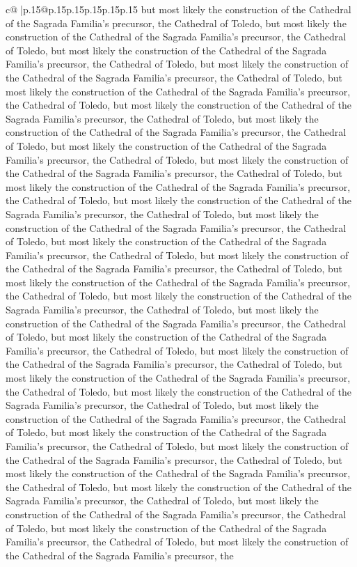 \documentclass{article}
\begin{document}
{\begin{supertabular}{c@{$\;$}|p{.15\linewidth}@{}p{.15\linewidth}p{.15\linewidth}p{.15\linewidth}p{.15\linewidth}p{.15\linewidth}}
{{{but most likely the construction of the Cathedral of the Sagrada Familia's precursor, the Cathedral of Toledo, but most likely the construction of the Cathedral of the Sagrada Familia's precursor, the Cathedral of Toledo, but most likely the construction of the Cathedral of the Sagrada Familia's precursor, the Cathedral of Toledo, but most likely the construction of the Cathedral of the Sagrada Familia's precursor, the Cathedral of Toledo, but most likely the construction of the Cathedral of the Sagrada Familia's precursor, the Cathedral of Toledo, but most likely the construction of the Cathedral of the Sagrada Familia's precursor, the Cathedral of Toledo, but most likely the construction of the Cathedral of the Sagrada Familia's precursor, the Cathedral of Toledo, but most likely the construction of the Cathedral of the Sagrada Familia's precursor, the Cathedral of Toledo, but most likely the construction of the Cathedral of the Sagrada Familia's precursor, the Cathedral of Toledo, but most likely the construction of the Cathedral of the Sagrada Familia's precursor, the Cathedral of Toledo, but most likely the construction of the Cathedral of the Sagrada Familia's precursor, the Cathedral of Toledo, but most likely the construction of the Cathedral of the Sagrada Familia's precursor, the Cathedral of Toledo, but most likely the construction of the Cathedral of the Sagrada Familia's precursor, the Cathedral of Toledo, but most likely the construction of the Cathedral of the Sagrada Familia's precursor, the Cathedral of Toledo, but most likely the construction of the Cathedral of the Sagrada Familia's precursor, the Cathedral of Toledo, but most likely the construction of the Cathedral of the Sagrada Familia's precursor, the Cathedral of Toledo, but most likely the construction of the Cathedral of the Sagrada Familia's precursor, the Cathedral of Toledo, but most likely the construction of the Cathedral of the Sagrada Familia's precursor, the Cathedral of Toledo, but most likely the construction of the Cathedral of the Sagrada Familia's precursor, the Cathedral of Toledo, but most likely the construction of the Cathedral of the Sagrada Familia's precursor, the Cathedral of Toledo, but most likely the construction of the Cathedral of the Sagrada Familia's precursor, the Cathedral of Toledo, but most likely the construction of the Cathedral of the Sagrada Familia's precursor, the Cathedral of Toledo, but most likely the construction of the Cathedral of the Sagrada Familia's precursor, the Cathedral of Toledo, but most likely the construction of the Cathedral of the Sagrada Familia's precursor, the Cathedral of Toledo, but most likely the construction of the Cathedral of the Sagrada Familia's precursor, the Cathedral of Toledo, but most likely the construction of the Cathedral of the Sagrada Familia's precursor, the Cathedral of Toledo, but most likely the construction of the Cathedral of the Sagrada Familia's precursor, the Cathedral of Toledo, but most likely the construction of the Cathedral of the Sagrada Familia's precursor, the Cathedral of Toledo, but most likely the construction of the Cathedral of the Sagrada Familia's precursor, the }}}
\end{supertabular}}
\end{document}
